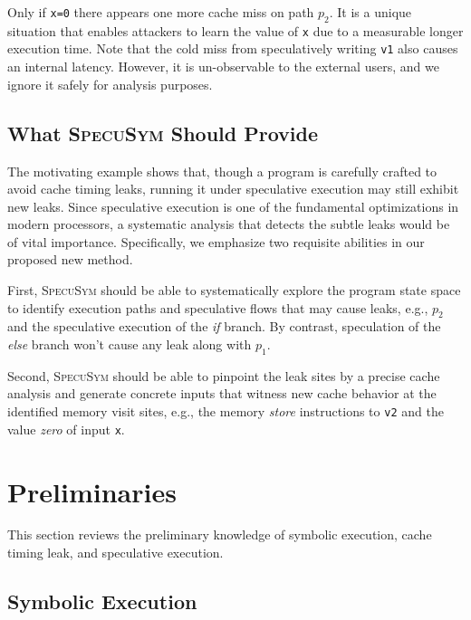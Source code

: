 \documentclass[sigconf]{acmart}
\newcommand{\SpecuSym}{\textsc{SpecuSym} }
\begin{document}
Only if \texttt{x=0} there appears one more cache miss on path $p_2$. It is a 
unique situation that enables attackers to learn the value of \texttt{x} due to 
a measurable longer execution time. Note that the cold miss from speculatively 
writing \texttt{v1} also causes an internal latency. However, it is un-observable 
to the external users, and we ignore it safely for analysis purposes.


\subsection{What \SpecuSym Should Provide}
\label{sec:app-scenarios}

The motivating example shows that, though a program is carefully crafted to 
avoid cache timing leaks, running it under speculative execution may still 
exhibit new leaks. Since speculative execution is one of the fundamental 
optimizations in modern processors, a systematic analysis that detects the 
subtle leaks would be of vital importance. Specifically, we emphasize two 
requisite abilities in our proposed new method.


First, \SpecuSym should be able to systematically explore the program state 
space to identify execution paths and speculative flows that may cause leaks, 
e.g., $\mathit{p_2}$ and the speculative execution of the \textit{if} branch. 
By contrast, speculation of the \textit{else} branch won't cause any leak along 
with $\mathit{p_1}$.


Second, \SpecuSym should be able to pinpoint the leak sites by a precise cache 
analysis and generate concrete inputs that witness new cache behavior at the 
identified memory visit sites, e.g., the memory \textit{store} instructions to 
\texttt{v2} and the value \textit{zero} of input \texttt{x}.


\section{Preliminaries}
\label{sec:prelim}

This section reviews the preliminary knowledge of symbolic execution, cache timing leak, 
and speculative execution.


\subsection{Symbolic Execution}
\label{sec:se}
\end{document}

